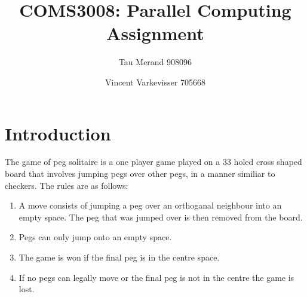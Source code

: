 \documentclass[12pt,a4paper]{report}
\begin{document}
\parindent0pt

\title{COMS3008: Parallel Computing Assignment}
\author{Tau Merand 908096 \and Vincent Varkevisser 705668}
\maketitle
\section*{Introduction}
The game of peg solitaire is a one player game played on a 33 holed cross shaped board that involves jumping pegs over other pegs, in a manner similiar to checkers. The rules are as follows:
\begin{enumerate}
  \item A move consists of jumping a peg over an orthoganal neighbour into an empty space. The peg that was jumped over is then removed from the board.
  \item Pegs can only jump onto an empty space.
  \item The game is won if the final peg is in the centre space.
  \item If no pegs can legally move or the final peg is not in the centre the game is lost.
\end{enumerate}
\end{document}
